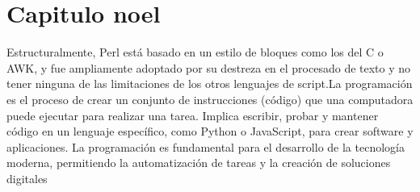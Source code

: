 \section{Capitulo noel}
Estructuralmente, Perl está basado en un estilo de bloques como los del C o AWK, y fue ampliamente adoptado por su destreza en el procesado de texto y no tener ninguna de las limitaciones de los otros lenguajes de script.La programación es el proceso de crear un conjunto de instrucciones (código) que una computadora puede ejecutar para realizar una tarea. Implica escribir, probar y mantener código en un lenguaje específico, como Python o JavaScript, para crear software y aplicaciones. La programación es fundamental para el desarrollo de la tecnología moderna, permitiendo la automatización de tareas y la creación de soluciones digitales